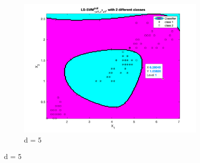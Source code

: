 \documentclass[a4paper, 11pt, one column]{article}
\begin{document}
\begin{figure}[]
\begin{subfigure}{0.33\linewidth}
            \includegraphics[width=\linewidth]{images/ls_svm_poly_deg5.png}
            \caption{d = 5}
        \end{subfigure}
        

\end{figure}
\end{document}
